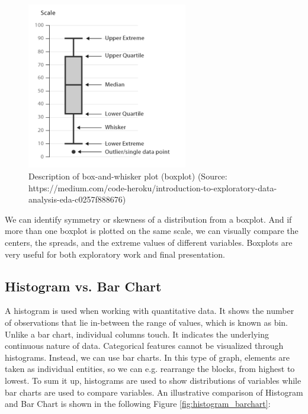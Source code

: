 \documentclass[a4paper,10pt,twoside]{article}
\begin{document}
\vspace{0.3cm}
\begin{figure}[hbt!] 
\begin{center}
\includegraphics[width=7cm]{../pictures/boxplot.png} 
\caption[Description of box-and-whisker plot (boxplot)]{Description of box-and-whisker plot (boxplot) (Source: https://medium.com/code-heroku/introduction-to-exploratory-data-analysis-eda-c0257f888676)}
\label{fig:boxplot}
\end{center}
\end{figure}

\noindent We can identify symmetry or skewness of a distribution from a boxplot. And if more than one boxplot is plotted on the same scale, we can visually compare the centers, the spreads, and the extreme values of different variables.  Boxplots are very useful for both exploratory work and final presentation.

\subsection{Histogram vs. Bar Chart}

\noindent A histogram is used when working with quantitative data. It shows the number of observations that lie in-between the range of values, which is known as bin. Unlike a bar chart, individual columns touch. It indicates the underlying continuous nature of data. Categorical features cannot be visualized through histograms. Instead, we can use bar charts. In this type of graph, elements are taken as individual entities, so we can e.g. rearrange the blocks, from highest to lowest. To sum it up, histograms are used to show distributions of variables while bar charts are used to compare variables. An illustrative comparison of Histogram and Bar Chart is shown in the following Figure \ref{fig:histogram_barchart}:
\end{document}
